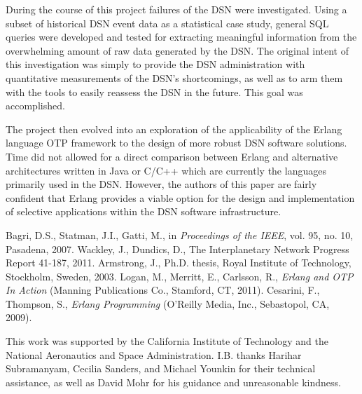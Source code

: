 \documentclass[aps,twocolumn,nobalancelastpage,amsmath,amssymb,
nofootinbib,superscriptaddress, ]{revtex4}
\begin{document}
During the course of this project failures of the DSN were investigated. Using a subset of historical DSN event data as a statistical case study, general SQL queries were developed and tested for extracting meaningful information from the overwhelming amount of raw data generated by the DSN. The original intent of this investigation was simply to provide the DSN administration with quantitative measurements of the DSN's shortcomings, as well as to arm them with the tools to easily reassess the DSN in the future. This goal was accomplished.

The project then evolved into an exploration of the applicability of the Erlang language OTP framework to the design of more robust DSN software solutions. Time did not allowed for a direct comparison between Erlang and alternative architectures written in Java or C/C++ which are currently the languages primarily used in the DSN.  However, the authors of this paper are fairly confident that Erlang provides a viable option for the design and implementation of selective applications within the DSN software infrastructure.  





\begin{thebibliography}{99}
Bagri, D.S., Statman, J.I., Gatti, M., in \textit{Proceedings of the IEEE}, vol. 95, no. 10, Pasadena,  2007.
Wackley, J., Dundics, D., The Interplanetary Network Progress Report 41-187, 2011.
Armstrong, J., Ph.D. thesis, Royal Institute of Technology, Stockholm, Sweden, 2003.
Logan, M., Merritt, E., Carlsson, R., \textit{Erlang and OTP In Action} (Manning Publications Co., Stamford, CT, 2011).
Cesarini, F., Thompson, S., \textit{Erlang Programming} (O'Reilly Media, Inc., Sebastopol, CA, 2009).
\end{thebibliography}



\begin{acknowledgments} 
This work was supported by the California Institute of Technology and the National Aeronautics and Space Administration. I.B. thanks Harihar Subramanyam, Cecilia Sanders, and Michael Younkin for their technical assistance, as well as David Mohr for his guidance and unreasonable kindness.
\end{acknowledgments}
\end{document}
